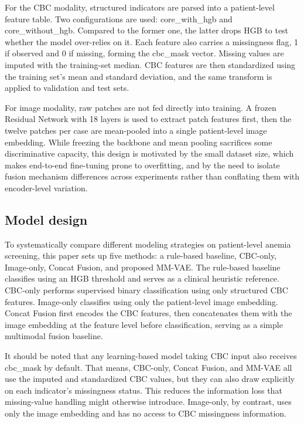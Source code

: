 \documentclass[conference]{IEEEtran}
\begin{document}
For the CBC modality, structured indicators are parsed into a patient-level feature table. Two configurations are used: core\_with\_hgb and core\_without\_hgb. Compared to the former one, the latter drops HGB to test whether the model over-relies on it. Each feature also carries a missingness flag, 1 if observed and 0 if missing, forming the cbc\_mask vector. Missing values are imputed with the training-set median. CBC features are then standardized using the training set's mean and standard deviation, and the same transform is applied to validation and test sets.

For image modality, raw patches are not fed directly into training. A frozen Residual Network with 18 layers is used to extract patch features first, then the twelve patches per case are mean-pooled into a single patient-level image embedding. While freezing the backbone and mean pooling sacrifices some discriminative capacity, this design is motivated by the small dataset size, which makes end-to-end fine-tuning prone to overfitting, and by the need to isolate fusion mechanism differences across experiments rather than conflating them with encoder-level variation.

\subsection{Model design}

To systematically compare different modeling strategies on patient-level anemia screening, this paper sets up five methods: a rule-based baseline, CBC-only, Image-only, Concat Fusion, and proposed MM-VAE. The rule-based baseline classifies using an HGB threshold and serves as a clinical heuristic reference. CBC-only performs supervised binary classification using only structured CBC features. Image-only classifies using only the patient-level image embedding. Concat Fusion first encodes the CBC features, then concatenates them with the image embedding at the feature level before classification, serving as a simple multimodal fusion baseline.

It should be noted that any learning-based model taking CBC input also receives cbc\_mask by default. That means, CBC-only, Concat Fusion, and MM-VAE all use the imputed and standardized CBC values, but they can also draw explicitly on each indicator's missingness status. This reduces the information loss that missing-value handling might otherwise introduce. Image-only, by contrast, uses only the image embedding and has no access to CBC missingness information.
\end{document}

